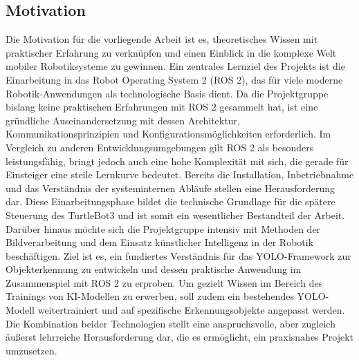 \subsection{Motivation}
Die Motivation für die vorliegende Arbeit ist es, theoretisches Wissen mit praktischer Erfahrung zu verknüpfen und einen Einblick in die komplexe Welt mobiler Robotiksysteme zu gewinnen.
Ein zentrales Lernziel des Projekts ist die Einarbeitung in das Robot Operating System 2 (ROS 2), das für viele moderne Robotik-Anwendungen als technologische Basis dient. 
Da die Projektgruppe bislang keine praktischen Erfahrungen mit ROS 2 gesammelt hat, ist eine gründliche Auseinandersetzung mit dessen Architektur, Kommunikationsprinzipien und Konfigurationsmöglichkeiten erforderlich. 
Im Vergleich zu anderen Entwicklungsumgebungen gilt ROS 2 als besonders leistungsfähig, bringt jedoch auch eine hohe Komplexität mit sich, die gerade für Einsteiger eine steile Lernkurve bedeutet. 
Bereits die Installation, Inbetriebnahme und das Verständnis der systeminternen Abläufe stellen eine Herausforderung dar.
Diese Einarbeitungsphase bildet die technische Grundlage für die spätere Steuerung des TurtleBot3 und ist somit ein wesentlicher Bestandteil der Arbeit.
\newPar
Darüber hinaus möchte sich die Projektgruppe intensiv mit Methoden der Bildverarbeitung und dem Einsatz künstlicher Intelligenz in der Robotik beschäftigen. 
Ziel ist es, ein fundiertes Verständnis für das YOLO-Framework zur Objekterkennung zu entwickeln und dessen praktische Anwendung im Zusammenspiel mit ROS 2 zu erproben. 
Um gezielt Wissen im Bereich des Trainings von KI-Modellen zu erwerben, soll zudem ein bestehendes YOLO-Modell weitertrainiert und auf spezifische Erkennungsobjekte angepasst werden.
Die Kombination beider Technologien stellt eine anspruchsvolle, aber zugleich äußerst lehrreiche Herausforderung dar, die es ermöglicht, ein praxisnahes Projekt umzusetzen.